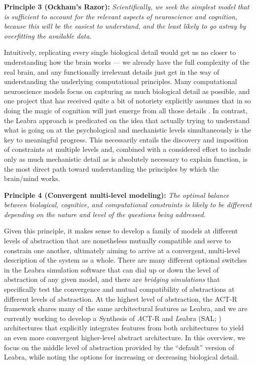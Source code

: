 \documentclass[11pt,twoside]{article}
\begin{document}
{\bf Principle 3 (Ockham's Razor):} {\em Scientifically, we seek the simplest
  model that is sufficient to account for the relevant aspects of neuroscience
  and cognition, because this will be the easiest to understand, and the least
  likely to go astray by overfitting the available data.}

Intuitively, replicating every single biological detail would get us no closer
to understanding how the brain works --- we already have the full complexity
of the real brain, and any functionally irrelevant details just get in the way
of understanding the underlying computational principles.  Many computational
neuroscience models focus on capturing as much biological detail as possible,
and one project that has received quite a bit of notoriety explicitly assumes
that in so doing the magic of cognition will just emerge from all those
details \cite{MarkramBlueBrain}.  In contrast, the Leabra approach is
predicated on the idea that actually trying to understand what is going on at
the psychological and mechanistic levels simultaneously is the key to
meaningful progress. This necessarily entails the discovery and imposition of
constraints at multiple levels and, combined with a considered effort to
include only as much mechanistic detail as is absolutely necessary to explain
function, is the most direct path toward understanding the principles by which
the brain/mind works.

{\bf Principle 4 (Convergent multi-level modeling):} {\em The optimal balance
  between biological, cognitive, and computational constraints is likely to be
  different depending on the nature and level of the questions being
  addressed.}  

Given this principle, it makes sense to develop a family of models at
different levels of abstraction that are nonetheless mutually compatible and
serve to constrain one another, ultimately aiming to arrive at a convergent,
multi-level description of the system as a whole.  There are many different
optional switches in the Leabra simulation software that can dial up or down
the level of abstraction of any given model, and there are {\em bridging
  simulations} that specifically test the convergence and mutual compatibility
of abstractions at different levels of abstraction.  At the highest level of
abstraction, the ACT-R framework shares many of the same architectural
features as Leabra, and we are currently working to develop a {\em S}ynthesis
of {\em A}CT-R and {\em L}eabra (SAL; )
architectures that explicitly integrates features from both architectures to
yield an even more convergent higher-level abstract architecture.  In this
overview, we focus on the middle level of abstraction provided by the
``default'' version of Leabra, while noting the options for increasing or
decreasing biological detail.
\end{document}
